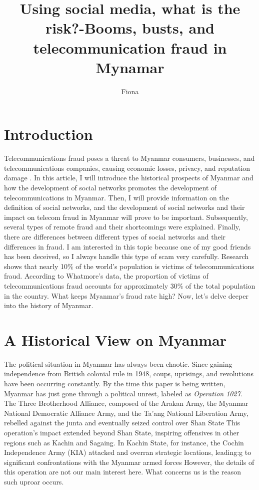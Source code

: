 \documentclass[man,floatsintext]{apa7}
\title{Using social media, what is the risk?-Booms, busts, and telecommunication fraud in Mynamar}
\author{Fiona}
\affiliation{}
\begin{document}
\maketitle
\tableofcontents
\newpage
\section{Introduction}

Telecommunications fraud poses a threat to Myanmar consumers, businesses, and telecommunications companies, causing economic losses, privacy, and reputation damage \autocite{graboskyTelecommunicationFraudDigital2001}. In this article, I will introduce the historical prospects of Myanmar and how the development of social networks promotes the development of telecommunications in Myanmar. Then, I will provide information on the definition of social networks, and the development of social networks and their impact on telecom fraud in Myanmar will prove to be important. Subsequently, several types of remote fraud and their shortcomings were explained. Finally, there are differences between different types of social networks and their differences in fraud. I am interested in this topic because one of my good friends has been deceived, so I always handle this type of scam very carefully. Research shows that nearly 10\% of the world's population is victims of telecommunications fraud. According to Whatmore's data, the proportion of victims of telecommunications fraud accounts for approximately 30\% of the total population in the country. What keeps Myanmar's fraud rate high? Now, let's delve deeper into the history of Myanmar.

\section{A Historical View on Myanmar}

The political situation in Myanmar has always been chaotic. Since gaining independence from British colonial rule in 1948, coups, uprisings, and revolutions have been occurring constantly. By the time this paper is being written, Myanmar has just gone through a political unrest, labeled as \textit{Operation 1027}. The Three Brotherhood Alliance, composed of the Arakan Army, the Myanmar National Democratic Alliance Army, and the Ta'ang National Liberation Army, rebelled against the junta and eventually seized control over Shan State \autocite{yunsunOperation1027Changing2024} This operation's impact extended beyond Shan State, inspiring offensives in other regions such as Kachin and Sagaing. In Kachin State, for instance, the Cochin Independence Army (KIA) attacked and overran strategic locations, leading:g to significant confrontations with the Myanmar armed forces \autocite{theinternationalinstituteforstrategicstudiesOperation1027Reshapes2023} However, the details of this operation are not our main interest here. What concerns us is the reason such uproar occurs.
\end{document}
